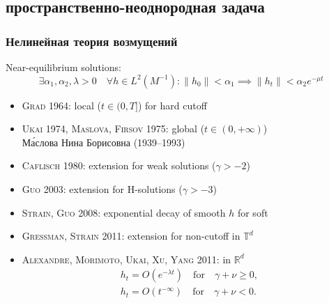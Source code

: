 \documentclass[mathserif]{beamer} %
\newcommand{\OO}[1]{O(#1)}
\newcommand{\Cite}[2][]{\alert{\textsc{#2 #1}}}
\begin{document}
\subsection{пространственно-неоднородная задача}

\begin{frame}
    \frametitle{Нелинейная теория возмущений}
    Near-equilibrium solutions:
    \[ \exists \alpha_1, \alpha_2, \lambda > 0 \quad \forall h\in L^2(M^{-1}):
        \|h_0\|<\alpha_1 \implies \|h_t\|<\alpha_2 e^{-\mu t}  \] \vspace{-10pt}
    \begin{itemize}
        \item \Cite[1964]{Grad}: local (\(t\in(0,T]\)) for hard cutoff
        \item \Cite[1974]{Ukai}, \Cite[1975]{Maslova, Firsov}: global (\(t\in(0,+\infty)\))\\
            {\footnotesize М\'{а}слова Нина Борисовна (1939--1993)}
        \item \Cite[1980]{Caflisch}: extension for weak solutions (\(\gamma>-2\))
        \item \Cite[2003]{Guo}: extension for H-solutions (\(\gamma>-3\))
        \item \Cite[2008]{Strain, Guo}: exponential decay of smooth \(h\) for soft
        \item \Cite[2011]{Gressman, Strain}: extension for non-cutoff in \(\mathbb{T}^d\)
        \item \Cite[2011]{Alexandre, Morimoto, Ukai, Xu, Yang}: in \(\mathbb{R}^d\)
        \begin{gather*}
            h_t = \OO{e^{-\lambda t}} \quad\text{for}\quad \gamma+\nu \geq0, \\
            h_t =\OO{t^{-\infty}} \quad\text{for}\quad \gamma+\nu <0.
        \end{gather*}
    \end{itemize}
\end{frame}
\end{document}
